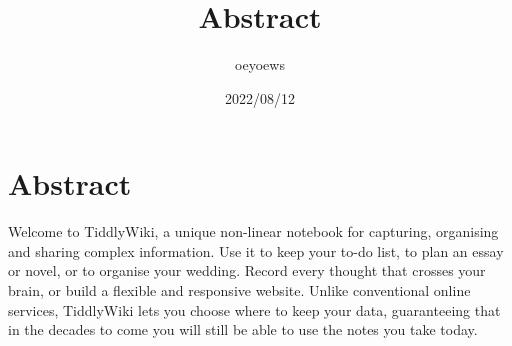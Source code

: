 \documentclass[UTF8]{article}
\title{Abstract \emoji{rocket}}
\author{oeyoews}
\date{2022/08/12}
\begin{document}
\maketitle

\section{ Abstract}%
\label{sec:emoji}

Welcome to TiddlyWiki, a unique non-linear notebook for capturing, organising and sharing complex information.
Use it to keep your to-do list, to plan an essay or novel, or to organise your wedding. Record every thought that crosses your brain, or build a flexible and responsive website. Unlike conventional online services, TiddlyWiki lets you choose where to keep your data, guaranteeing that in the decades to come you will still be able to use the notes you take today.
\end{document}
